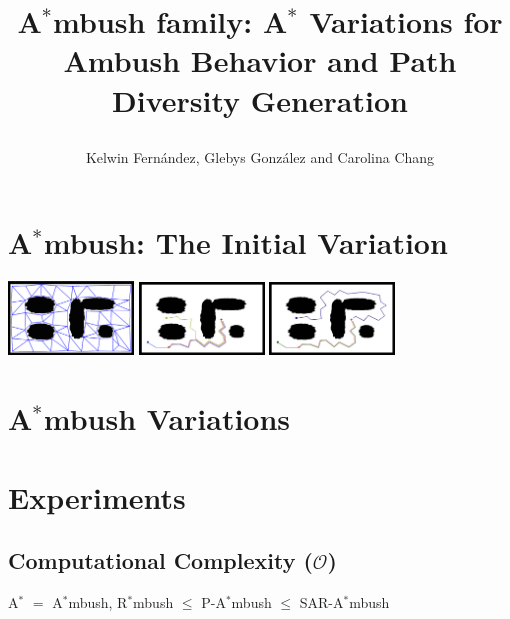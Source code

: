 \documentclass[portrait]{sciposter}
\title{\begin{Huge}
A$^*$mbush family: A$^*$ Variations for Ambush 
Behavior and Path Diversity Generation
\end{Huge}}
\author{Kelwin Fern\'andez, Glebys Gonz\'alez and Carolina Chang}
\institute{Universidad Sim\'on Bol\'ivar.
           Caracas, Venezuela}
\newcommand{\bigO}{\mathcal{O}}
\begin{document}
\maketitle


\begin{multicols}{2}

\end{multicols}

\section*{A$^*$mbush: The Initial Variation}

\begin{multicols}{3}



\end{multicols}

\bigskip
\begin{center}
\includegraphics[width=0.25\textwidth]{figures/g2.png}
\hspace*{0.25cm}
\includegraphics[width=0.25\textwidth]{figures/astar_contrast.jpg}
\hspace*{0.25cm}
\includegraphics[width=0.25\textwidth]{figures/ambush_contrast.jpg}
\end{center}

\section*{A$^*$mbush Variations}

\begin{multicols}{3}



\end{multicols}

\section*{Experiments}
\begin{multicols}{2}



\section*{Computational Complexity ($\bigO$)}

\begin{center}
A$^*$ $=$ A$^*$mbush, R$^*$mbush $\leq$ P-A$^*$mbush
$\leq$ SAR-A$^*$mbush
\end{center}
\end{multicols}
\end{document}
